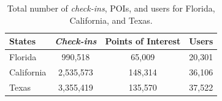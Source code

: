 \begin{table}[htbp]
\centering
\caption{Total number of \textit{check-ins}, POIs, and users for Florida, California, and Texas.}
\label{tab:dataset}
\begin{tabular}{lccc}
\hline
States & \textit{Check-ins} & Points of Interest & Users \\
\hline
Florida & 990,518 & 65,009 & 20,301 \\
California & 2,535,573 & 148,314 & 36,106 \\
Texas & 3,355,419 & 135,570 & 37,522 \\
\hline
\end{tabular}
\end{table}